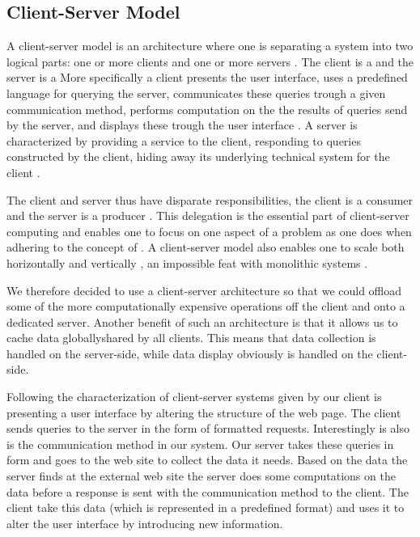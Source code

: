 \subsection{Client-Server Model}

A client-server model is an architecture where one is separating a system into
two logical parts:
one or more clients and one or more servers \citep[]{lewandowski98}.
The client is a 
and the server is a 
More specifically a client presents the user interface, uses a predefined
language for querying the server, communicates these queries trough a given
communication method, performs computation on the the results of queries send
by the server, and displays these trough the user interface
\citep[]{sinha92}. A server is characterized by providing a service
to the client, responding to queries constructed by the client,
hiding away its underlying technical system for the client
\citep[]{sinha92}.

The client and server thus have disparate responsibilities, the client is a
consumer and the server is a producer \citep[]{lewandowski98}.
This delegation is the
essential part of client-server computing and enables one to focus on one
aspect of a problem as one does when adhering to the concept of
 \citep[]{dijkstra82}.
A client-server model also enables one to scale both horizontally and
vertically%
,
an impossible feat with monolithic systems \citep[]{lewandowski98}.

We therefore decided to use a client-server architecture so that we could
offload some of the more computationally expensive operations off the client
and onto a dedicated server. Another benefit of such an architecture is that
it allows us to cache data globally\dash{}shared by all clients. This means
that data collection is handled on the server-side, while data display
obviously is handled on the client-side.

Following the characterization of client-server systems given by
\citeauthor{sinha92} our client is presenting a user interface
by altering the structure of the \urort{} web page. The client sends queries
to the server in the form of %
formatted requests. Interestingly  is also is the communication
method in our system. Our server takes these queries in  form
and goes to the \urort{} web site to collect the data it needs. Based on the
data the server finds at the external \urort{} web site the server does some
computations on the data before a response is sent
with the  communication method to the client. The client take this
data (which is represented in a predefined format) and uses it to alter the
user interface by introducing new information.

